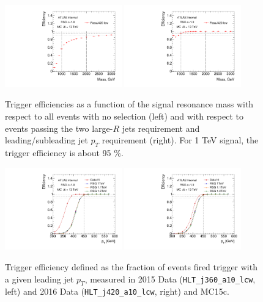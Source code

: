 \begin{figure}[htbp!]
\begin{center}
\includegraphics[width=0.45\textwidth,angle=-90]{figures/boosted/Trigger/trig_Moriond_Efficiency_PreSel.pdf}
\includegraphics[width=0.45\textwidth,angle=-90]{figures/boosted/Trigger/trig_Moriond_Efficiency_All.pdf}
  \caption{Trigger efficiencies as a function of the signal resonance mass with respect to all events with no selection (left) and with respect to events passing the two large-$R$ jets requirement and leading/subleading jet $p_{T}$ requirement (right). For 1 TeV signal, the trigger efficiency is about 95 \%.}
  \label{fig:boosted-trigger-HLT}
\end{center}
\end{figure}

\begin{figure}[htbp!]
\begin{center}
\includegraphics[width=0.45\textwidth,angle=-90]{figures/boosted/Trigger/trig_15_b77_pT_Efficiency.pdf}
\includegraphics[width=0.45\textwidth,angle=-90]{figures/boosted/Trigger/trig_16_b77_pT_Efficiency.pdf}
  \caption{Trigger efficiency defined as the fraction of events fired trigger with a given leading jet $p_{T}$, measured in 2015 Data (\texttt{HLT\_j360\_a10\_lcw}, left) and 2016 Data (\texttt{HLT\_j420\_a10\_lcw}, right) and MC15c.}
  \label{fig:boosted-trigger-HLT-turnon}
\end{center}
\end{figure}

